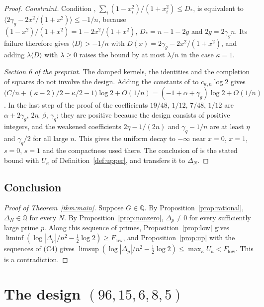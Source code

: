 \documentclass[11pt]{article}
\theoremstyle{definition}
\begin{document}
\begin{proof}
\emph{Constraint.} Condition \cite[Eq.~(67)]{OAI}, $\sum_i(1-x_i^2)/(1+x_i^2)\le D_*$, is equivalent to $\langle2\gamma_g-2x^2/(1+x^2)\rangle\le-1/n$, because $(1-x^2)/(1+x^2)=1-2x^2/(1+x^2)$, $D_*=n-1-2g$ and $2g=2\gamma_gn$. Its failure therefore gives $\langle D\rangle>-1/n$ with $D(x)=2\gamma_g-2x^2/(1+x^2)$, and adding $\lambda\langle D\rangle$ with $\lambda\ge0$ raises the bound by at most $\lambda/n$ in the case $\kappa=1$.

\emph{Section 6 of the preprint.} The damped kernels, the identities \cite[Eqs.~(86), (87)]{OAI} and the completion of squares do not involve the design. Adding the constants of \cite[Eqs.~(86), (87)]{OAI} to $c_{\kappa,n}\log2$ gives $\big(C/n+(\kappa-2)/2-\kappa/2-1\big)\log2+O(1/n)=(-1+\alpha+\gamma_g)\log2+O(1/n)$. In the last step of the proof of \cite[Prop.~6.1]{OAI} the coefficients $19/48$, $1/12$, $7/48$, $1/12$ are $\alpha+2\gamma_g$, $2\eta$, $\beta$, $\gamma_q$; they are positive because the design consists of positive integers, and the weakened coefficients $2\eta-1/(2n)$ and $\gamma_q-1/n$ are at least $\eta$ and $\gamma_q/2$ for all large $n$. This gives the uniform decay to $-\infty$ near $x=0$, $x=1$, $s=0$, $s=1$ and the compactness used there. The conclusion of \cite[Prop.~6.1]{OAI} is the stated bound with $U_\kappa$ of Definition~\ref{def:upper}, and \cite[Eq.~(75)]{OAI} transfers it to $\Delta_N$.
\end{proof}

\subsection{Conclusion}

\begin{proof}[Proof of Theorem~\ref{thm:main}]
Suppose $G\in\mathbb Q$. By Proposition~\ref{prop:rational}, $\Delta_N\in\mathbb Q$ for every $N$. By Proposition~\ref{prop:nonzero}, $\Delta_p\ne0$ for every sufficiently large prime $p$. Along this sequence of primes, Proposition~\ref{prop:low} gives $\liminf(\log|\Delta_p|/n^2-\frac12\log2)\ge F_{\mathrm{low}}$, and Proposition~\ref{prop:up} with the sequences of (C4) gives $\limsup(\log|\Delta_p|/n^2-\frac12\log2)\le\max_\kappa U_\kappa<F_{\mathrm{low}}$. This is a contradiction.
\end{proof}

\section{The design \texorpdfstring{$(96,15,6,8,5)$}{(96,15,6,8,5)}}\label{sec:design}
\end{document}
